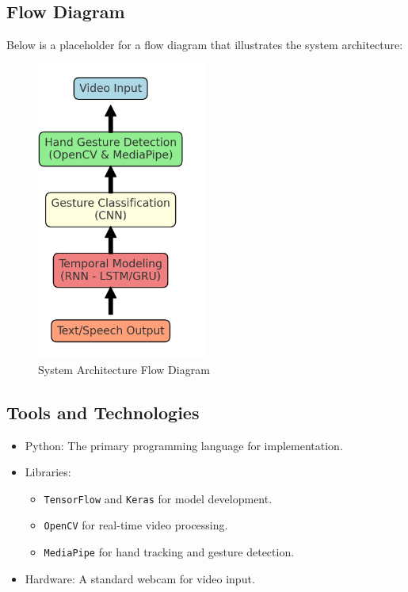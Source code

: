 \documentclass{article}
\begin{document}
\subsection*{Flow Diagram}
Below is a placeholder for a flow diagram that illustrates the system architecture:
\begin{figure}[h]
    \centering
    \includegraphics[width=0.5\textwidth]{Screenshot 2024-10-13 180653.png}
    \caption{System Architecture Flow Diagram}
    \label{fig:flowchart}
\end{figure}

\subsection*{Tools and Technologies} 
\begin{itemize}
    \item Python: The primary programming language for implementation.
    \item Libraries:
        \begin{itemize}
            \item \texttt{TensorFlow} and \texttt{Keras} for model development.
            \item \texttt{OpenCV} for real-time video processing.
            \item \texttt{MediaPipe} for hand tracking and gesture detection.
        \end{itemize}
    \item Hardware: A standard webcam for video input.
\end{itemize}
\end{document}
